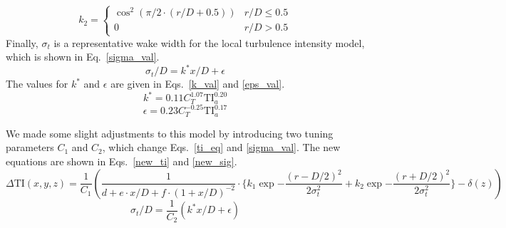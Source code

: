 \documentclass[11pt,letterpaper]{article}
\begin{document}
%
\begin{equation}
    \label{k2_val}
    k_2 = \begin{cases} 
      \cos^2{(\pi/2 \cdot (r/D + 0.5))} & r/D \leq 0.5 \\
      0 & r/D > 0.5
   \end{cases}
\end{equation}
% 
Finally, $\sigma_t$ is a representative wake width for the local turbulence intensity model, which is shown in Eq.~\ref{sigma_val}.
%
\begin{equation}
    \label{sigma_val}
    \sigma_t/D = k^* x/D + \epsilon
\end{equation}
% 
The values for $k^*$ and $\epsilon$ are given in Eqs.~\ref{k_val} and \ref{eps_val}.
%
\begin{equation}
    \label{k_val}
    k^* = 0.11 C_T^{1.07} \text{TI}_a ^ {0.20}
\end{equation}
%
\begin{equation}
    \label{eps_val}
    \epsilon = 0.23 C_T^{-0.25} \text{TI}_a^{0.17}
\end{equation}

We made some slight adjustments to this model by introducing two tuning parameters $C_1$ and $C_2$, which change Eqs.~\ref{ti_eq} and \ref{sigma_val}. The new equations are shown in Eqs.~\ref{new_ti} and \ref{new_sig}.
% 
\begin{equation}
    \label{new_ti}
    \Delta \text{TI}(x,y,z) = \frac{1}{C_1}(\frac{1}{d + e \cdot x/D + f\cdot(1+x/D)^{-2}} \cdot \Big\{k_1 \exp{-\frac{(r-D/2)^2}{2\sigma_t^2}} + k_2 \exp{-\frac{(r+D/2)^2}{2\sigma_t^2}} \Big\} - \delta(z))
\end{equation}
%
\begin{equation}
    \label{new_sig}
    \sigma_t/D = \frac{1}{C_2}(k^* x/D + \epsilon)
\end{equation}
\end{document}
